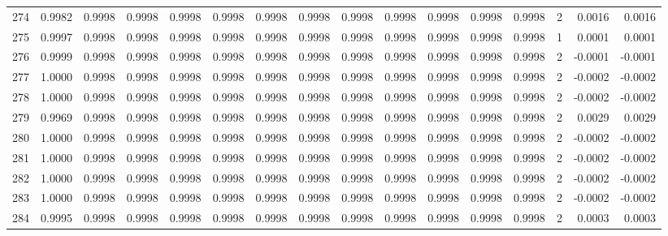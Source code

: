 \begin{tabular}{lrrrrrrrrrrrrrrr}
274 &      0.9982 &  0.9998 &  0.9998 &  0.9998 &  0.9998 &  0.9998 &  0.9998 &  0.9998 &  0.9998 &  0.9998 &   0.9998 &     0.9998 &      2 &                    0.0016 &                     0.0016 \\
275 &      0.9997 &  0.9998 &  0.9998 &  0.9998 &  0.9998 &  0.9998 &  0.9998 &  0.9998 &  0.9998 &  0.9998 &   0.9998 &     0.9998 &      1 &                    0.0001 &                     0.0001 \\
276 &      0.9999 &  0.9998 &  0.9998 &  0.9998 &  0.9998 &  0.9998 &  0.9998 &  0.9998 &  0.9998 &  0.9998 &   0.9998 &     0.9998 &      2 &                   -0.0001 &                    -0.0001 \\
277 &      1.0000 &  0.9998 &  0.9998 &  0.9998 &  0.9998 &  0.9998 &  0.9998 &  0.9998 &  0.9998 &  0.9998 &   0.9998 &     0.9998 &      2 &                   -0.0002 &                    -0.0002 \\
278 &      1.0000 &  0.9998 &  0.9998 &  0.9998 &  0.9998 &  0.9998 &  0.9998 &  0.9998 &  0.9998 &  0.9998 &   0.9998 &     0.9998 &      2 &                   -0.0002 &                    -0.0002 \\
279 &      0.9969 &  0.9998 &  0.9998 &  0.9998 &  0.9998 &  0.9998 &  0.9998 &  0.9998 &  0.9998 &  0.9998 &   0.9998 &     0.9998 &      2 &                    0.0029 &                     0.0029 \\
280 &      1.0000 &  0.9998 &  0.9998 &  0.9998 &  0.9998 &  0.9998 &  0.9998 &  0.9998 &  0.9998 &  0.9998 &   0.9998 &     0.9998 &      2 &                   -0.0002 &                    -0.0002 \\
281 &      1.0000 &  0.9998 &  0.9998 &  0.9998 &  0.9998 &  0.9998 &  0.9998 &  0.9998 &  0.9998 &  0.9998 &   0.9998 &     0.9998 &      2 &                   -0.0002 &                    -0.0002 \\
282 &      1.0000 &  0.9998 &  0.9998 &  0.9998 &  0.9998 &  0.9998 &  0.9998 &  0.9998 &  0.9998 &  0.9998 &   0.9998 &     0.9998 &      2 &                   -0.0002 &                    -0.0002 \\
283 &      1.0000 &  0.9998 &  0.9998 &  0.9998 &  0.9998 &  0.9998 &  0.9998 &  0.9998 &  0.9998 &  0.9998 &   0.9998 &     0.9998 &      2 &                   -0.0002 &                    -0.0002 \\
284 &      0.9995 &  0.9998 &  0.9998 &  0.9998 &  0.9998 &  0.9998 &  0.9998 &  0.9998 &  0.9998 &  0.9998 &   0.9998 &     0.9998 &      2 &                    0.0003 &                     0.0003 \\

\end{tabular}
